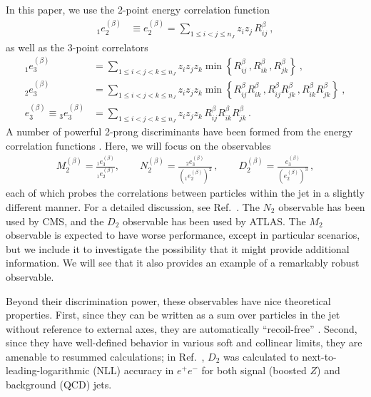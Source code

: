\documentclass[11pt,letterpaper]{article}
\DeclareRobustCommand{\Ref}[1]{Ref.~\cite{#1}}
\newcommand{\ecf}[2]{e_{#1}^{(#2)}}
\newcommand{\ecfvar}[3]{{_{#1}e_{#2}^{(#3)}}}
\newcommand{\Dobs}[2]{D_{#1}^{(#2)}}
\newcommand{\Dobsnobeta}[1]{D_{#1}}
\begin{document}
In this paper, we use the 2-point energy correlation function
\begin{align}\label{eq:explicit_twopointvar}
\ecfvar{1}{2}{\beta}&\equiv\ecf{2}{\beta}=\sum_{1\leq i<j\leq n_J} z_{i}z_{j} \, R_{ij}^\beta\ ,
\end{align}
as well as the 3-point correlators
\begin{align}\label{eq:explicit_ecfvar}
\ecfvar{1}{3}{\beta}&=\sum_{1\leq i<j<k\leq n_J} z_{i}z_{j}z_{k} \min \left\{ R_{ij}^\beta\,,  R_{ik}^\beta\,, R_{jk}^\beta  \right\} \ , \nonumber \\
\ecfvar{2}{3}{\beta}&=\sum_{1\leq i<j<k\leq n_J} z_{i}z_{j}z_{k} \min \left\{R_{ij}^\beta R_{ik}^\beta\,, R_{ij}^\beta  R_{jk}^\beta\,,     R_{ik}^\beta R_{jk}^\beta    \right\}  \ , \nonumber \\
\ecf{3}{\beta}\equiv\ecfvar{3}{3}{\beta}&=\sum_{1\leq i<j<k\leq n_J} z_{i}z_{j}z_{k} \, R_{ij}^\beta R_{ik}^\beta R_{jk}^\beta \,.
\end{align}
%
A number of powerful 2-prong discriminants have been formed from the energy correlation functions  \cite{Larkoski:2013eya,Larkoski:2014gra,Larkoski:2014zma,Moult:2016cvt}.  Here, we will focus on the observables
\begin{align}
 M_2^{(\beta)} = \frac{\ecfvar{1}{3}{\beta}}{\ecfvar{1}{2}{\beta}}, \qquad  N_2^{(\beta)} = \frac{\ecfvar{2}{3}{\beta}}{(\ecfvar{1}{2}{\beta})^2}\,, \qquad  \Dobs{2}{\beta}=\frac{\ecf{3}{\beta}}{(\ecf{2}{\beta})^{3}}\,, 
\end{align}
each of which probes the correlations between particles within the jet in a slightly different manner.
%
For a detailed discussion, see \Ref{Moult:2016cvt}.
%
The $N_2$ observable has been used by CMS, and the $D_2$ observable has been used by ATLAS.
%
The $M_2$ observable is expected to have worse performance, except in particular scenarios, but we include it to investigate the possibility that it might provide additional information.
%
We will see that it also provides an example of a remarkably robust observable.

Beyond their discrimination power, these observables have nice theoretical properties.
%
First, since they can be written as a sum over particles in the jet without reference to external axes, they are automatically ``recoil-free'' \cite{Catani:1992jc,Dokshitzer:1998kz,Banfi:2004yd,Larkoski:2013eya,Larkoski:2014uqa}.
%
Second, since they have well-defined behavior in various soft and collinear limits, they are amenable to resummed calculations;  in \Ref{Larkoski:2015kga}, $\Dobsnobeta{2}$ was calculated to next-to-leading-logarithmic (NLL) accuracy in $e^+e^-$ for both signal (boosted $Z$) and background (QCD) jets. 
\end{document}
